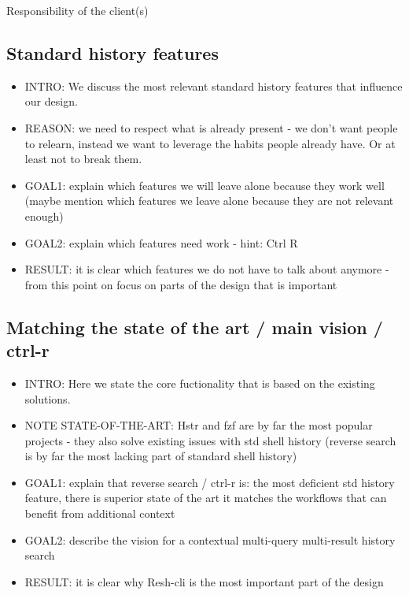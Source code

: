 \documentclass[thesis=M,english]{FITthesis}[2012/10/20]
\begin{document}
Responsibility of the client(s)

\subsection{Standard history features}

\begin{itemize}
    \item INTRO: We discuss the most relevant standard history features that influence our design.
    \item REASON: we need to respect what is already present - we don't want people to relearn, instead we want to leverage the habits people already have. Or at least not to break them.
    \item GOAL1: explain which features we will leave alone because they work well (maybe mention which features we leave alone because they are not relevant enough)
    \item GOAL2: explain which features need work - hint: Ctrl R
    \item RESULT: it is clear which features we do not have to talk about anymore - from this point on focus on parts of the design that is important
\end{itemize}


\subsection{Matching the state of the art / main vision / ctrl-r}

\begin{itemize}
    \item INTRO: Here we state the core fuctionality that is based on the existing solutions.
    \item NOTE STATE-OF-THE-ART: Hstr and fzf are by far the most popular projects - they also solve existing issues with std shell history (reverse search is by far the most lacking part of standard shell history)
    \item GOAL1: explain that reverse search / ctrl-r is:
    \subitem the most deficient std history feature, 
    \subitem there is superior state of the art
    \subitem it matches the workflows that can benefit from additional context
    \item GOAL2: describe the vision for a contextual multi-query multi-result history search
    \item RESULT: it is clear why Resh-cli is the most important part of the design
\end{itemize}
\end{document}
